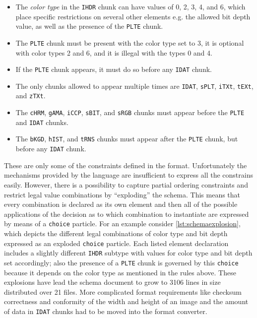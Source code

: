 \begin{itemize}
\item[] The \emph{color type} in the \texttt{IHDR} chunk can have values of 0, 2, 3, 4, and 6, which place
specific restrictions on several other elements e.g. the allowed bit depth value, as well as the presence of
the \texttt{PLTE} chunk.

\item[] The \texttt{PLTE} chunk must be present with the color type set to 3, it is optional with color types 2
and 6, and it is illegal with the types 0 and 4.

\item[] If the \texttt{PLTE} chunk appears, it must do so before any \texttt{IDAT} chunk.

\item[] The only chunks allowed to appear multiple times are \texttt{IDAT}, \texttt{sPLT}, \texttt{iTXt},
\texttt{tEXt}, and \texttt{zTXt}.

\item[] The \texttt{cHRM}, \texttt{gAMA}, \texttt{iCCP}, \texttt{sBIT}, and \texttt{sRGB} chunks must appear
before the \texttt{PLTE} and \texttt{IDAT} chunks.

\item[] The \texttt{bKGD}, \texttt{hIST}, and \texttt{tRNS} chunks must appear after the \texttt{PLTE} chunk,
but before any \texttt{IDAT} chunk.
\end{itemize}

These are only some of the constraints defined in the \png format. Unfortunately the mechanisms provided by
the \xsd language are insufficient to express all the constrains easily. However, there is a possibility to
capture partial ordering constraints and restrict legal value combinations by ``exploding'' the schema. This
means that every combination is declared as its own element and then all of the possible applications of the
decision as to which combination to instantiate are expressed by means of a \texttt{choice} particle.
For an example consider \cref{lst:schemaexplosion}, which depicts the different legal combinations of color
type and bit depth expressed as an exploded \texttt{choice} particle. Each listed element declaration includes
a slightly different \texttt{IHDR} subtype with values for color type and bit depth set accordingly; also the
presence of a \texttt{PLTE} chunk is governed by this \texttt{choice} because it depends on the color type as
mentioned in the rules above. These explosions have lead the schema document to grow to 3106 lines in size
distributed over 21 files. More complicated format requirements like checksum correctness and conformity of
the width and height of an image and the amount of data in \texttt{IDAT} chunks had to be moved into the format
converter.

